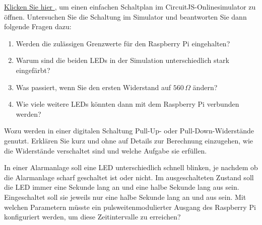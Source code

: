 
\teilaufgabe
\textcolor{red}{
    \href{%
        https://www.falstad.com/circuit/circuitjs.html?ctz=CQAgjCAMB0l3BWcMBMcUHYMGZIA4UA2ATmIxAUgoqoQFMBaMMAKAHMRCUAWCsFTjwoo8UKCwBOnDAO7dRGQqLmiqYSizBcQi5fJB5ss-QIAmdAGYBDAK4AbAC4M7dU+DFUYkVgBlpx0S5eFTEIazsAZzoQbGhscT9CGRi8XiCU3jUQcKiYuPEpJIFsVJ0lDLE8MGJoUjr6+pZsDCpDYtLifgqITyaWgyMQEM6A916AdxARiumQyBZJ2f1phC75rQFdCraKs0tbR2dXMY9YVkWu1YF0q4T-GLRBXiNPdxzo2Pj5wuSXstE-moNJMtn8doC+q1Bn9pn8euILsVHrDSvMAEacBCEECYJDcDDEChY8QADyGigoeFo3GxCEMQ3AAgASlYIgAHNF0CQATwAOhEAAoASxYZMoAKECGIz0wDK6AHEBQBJADyDAAgjYImwrAA7NiimiiVZpSACVbkXhdACyrKi-IAFPKJAB7Gy60wASkNlHIJVpxHiJUJVoEitVGq1Ov1PsgltWFEDQwQwUZIHDas12r1BoxO0wAkDxoQ5HmZNStDwSE6leUafldAAtnQIlFdXRDYZCYRINjOt3ICG0wBlByuxsRBwAE4kAGs6LqWEA
    }{
        Klicken Sie hier%
    }%
}, um einen einfachen Schaltplan im CircuitJS-Onlinesimulator zu öffnen.
Untersuchen Sie die Schaltung im Simulator und beantworten Sie dann folgende Fragen
dazu:

\begin{enumerate}
    \item Werden die zulässigen Grenzwerte für den Raspberry Pi eingehalten?
    \item Warum sind die beiden LEDs in der Simulation unterschiedlich stark eingefärbt?
    \item Was passiert, wenn Sie den ersten Widerstand auf $560\,\Omega$ ändern?
    \item Wie viele weitere LEDs könnten dann mit dem Raspberry Pi verbunden werden?
\end{enumerate}

\bigskip
\teilaufgabe
Wozu werden in einer digitalen Schaltung Pull-Up- oder Pull-Down-Widerstände
genutzt. Erklären Sie kurz und ohne auf Details zur Berechnung einzugehen, wie
die Widerstände verschaltet sind und welche Aufgabe sie erfüllen.

\bigskip
\teilaufgabe
In einer Alarmanlage soll eine LED unterschiedlich schnell blinken, je nachdem
ob die Alarmanlage scharf geschaltet ist oder nicht. Im ausgeschalteten Zustand
soll die LED immer eine Sekunde lang an und eine halbe Sekunde lang aus sein.
Eingeschaltet soll sie jeweils nur eine halbe Sekunde lang an und aus sein.
Mit welchen Parametern müsste ein pulsweitenmodulierter Ausgang des Raspberry
Pi konfiguriert werden, um diese Zeitintervalle zu erreichen?


